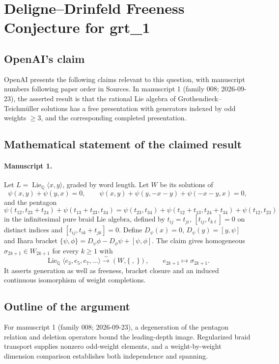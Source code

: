 \documentclass[11pt]{article}
\begin{document}
\section*{Deligne–Drinfeld Freeness Conjecture for grt\_1}

\subsection{OpenAI's claim}
OpenAI presents the following claims relevant to this question, with manuscript numbers following paper order in Sources. In manuscript 1 (family 008; 2026-09-23), the asserted result is that the rational Lie algebra of Grothendieck--Teichm\"uller solutions has a free presentation with generators indexed by odd weights $\ge3$, and the corresponding completed presentation.

\subsection{Mathematical statement of the claimed result}
\paragraph{Manuscript 1.}
Let $L=\operatorname{Lie}_{\mathbb Q}\langle x,y\rangle$, graded by word length. Let $W$ be its solutions of
\[
 \psi(x,y)+\psi(y,x)=0,\qquad
 \psi(x,y)+\psi(y,-x-y)+\psi(-x-y,x)=0,
\]
and the pentagon
\[
 \psi(t_{12},t_{23}+t_{24})+\psi(t_{13}+t_{23},t_{34})
 =\psi(t_{23},t_{34})+\psi(t_{12}+t_{13},t_{24}+t_{34})+\psi(t_{12},t_{23})
\]
in the infinitesimal pure braid Lie algebra, defined by $t_{ij}=t_{ji}$, $[t_{ij},t_{k\ell}]=0$ on distinct indices and $[t_{ij},t_{ik}+t_{jk}]=0$. Define $D_{\psi}(x)=0$, $D_{\psi}(y)=[y,\psi]$ and Ihara bracket $\{\psi,\phi\}=D_{\psi}\phi-D_{\phi}\psi+[\psi,\phi]$. The claim gives homogeneous $\sigma_{2k+1}\in W_{2k+1}$ for every $k\ge1$ with
\[
 \operatorname{Lie}_{\mathbb Q}\langle e_3,e_5,e_7,\ldots\rangle
 \xrightarrow{\sim}(W,\{\ ,\ \}),\qquad e_{2k+1}\mapsto\sigma_{2k+1}.
\]
It asserts generation as well as freeness, bracket closure and an induced continuous isomorphism of weight completions.

\subsection{Outline of the argument}
For manuscript 1 (family 008; 2026-09-23), a degeneration of the pentagon relation and deletion operators bound the leading-depth image. Regularized braid transport supplies nonzero odd-weight elements, and a weight-by-weight dimension comparison establishes both independence and spanning.
\end{document}
